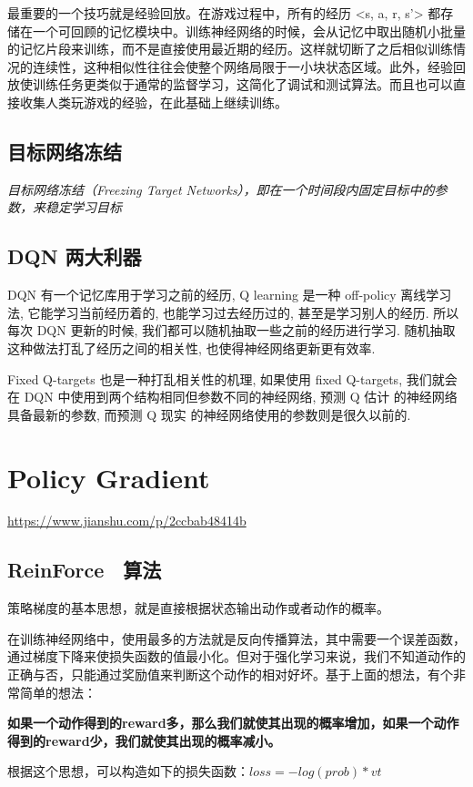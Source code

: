 \documentclass[UTF8,a4paper,12pt]{ctexbook}
\begin{document}
			最重要的一个技巧就是经验回放。在游戏过程中，所有的经历 <s, a, r, s'> 都存储在一个可回顾的记忆模块中。训练神经网络的时候，会从记忆中取出随机小批量的记忆片段来训练，而不是直接使用最近期的经历。这样就切断了之后相似训练情况的连续性，这种相似性往往会使整个网络局限于一小块状态区域。此外，经验回放使训练任务更类似于通常的监督学习，这简化了调试和测试算法。而且也可以直接收集人类玩游戏的经验，在此基础上继续训练。
		
		\subsection{目标网络冻结}
			\textit{目标网络冻结（Freezing Target Networks），即在一个时间段内固定目标中的参数，来稳定学习目标}
		
		\subsection{DQN 两大利器}
			DQN 有一个记忆库用于学习之前的经历, Q learning 是一种 off-policy 离线学习法, 它能学习当前经历着的, 也能学习过去经历过的, 甚至是学习别人的经历. 所以每次 DQN 更新的时候, 我们都可以随机抽取一些之前的经历进行学习. 随机抽取这种做法打乱了经历之间的相关性, 也使得神经网络更新更有效率. 
			
			Fixed Q-targets 也是一种打乱相关性的机理, 如果使用 fixed Q-targets, 我们就会在 DQN 中使用到两个结构相同但参数不同的神经网络, 预测 Q 估计 的神经网络具备最新的参数, 而预测 Q 现实 的神经网络使用的参数则是很久以前的. 
	
	
	\section{Policy Gradient}
		\url{https://www.jianshu.com/p/2ccbab48414b}
		
		\subsection{ReinForce　算法}
			策略梯度的基本思想，就是直接根据状态输出动作或者动作的概率。
			
			在训练神经网络中，使用最多的方法就是反向传播算法，其中需要一个误差函数，通过梯度下降来使损失函数的值最小化。但对于强化学习来说，我们不知道动作的正确与否，只能通过奖励值来判断这个动作的相对好坏。基于上面的想法，有个非常简单的想法：
			
			\textbf{如果一个动作得到的reward多，那么我们就使其出现的概率增加，如果一个动作得到的reward少，我们就使其出现的概率减小。}
			
			根据这个思想，可以构造如下的损失函数：$loss= -log(prob)*vt$
			
\end{document}
